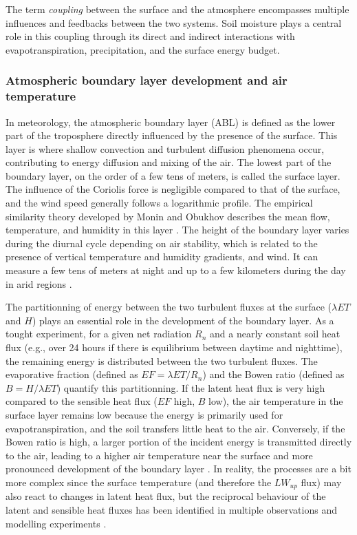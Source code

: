 The term \textit{coupling} between the surface and the atmosphere encompasses multiple influences and feedbacks between the two systems. Soil moisture plays a central role in this coupling through its direct and indirect interactions with evapotranspiration, precipitation, and the surface energy budget.

\subsubsection*{Atmospheric boundary layer development and air temperature}

In meteorology, the atmospheric boundary layer (ABL) is defined as the lower part of the troposphere directly influenced by the presence of the surface. This layer is where shallow convection and turbulent diffusion phenomena occur, contributing to energy diffusion and mixing of the air.
The lowest part of the boundary layer, on the order of a few tens of meters, is called the surface layer. The influence of the Coriolis force is negligible compared to that of the surface, and the wind speed generally follows a logarithmic profile. The empirical similarity theory developed by Monin and Obukhov describes the mean flow, temperature, and humidity in this layer \citep{monin1954osnovnye}.
The height of the boundary layer varies during the diurnal cycle depending on air stability, which is related to the presence of vertical temperature and humidity gradients, and wind. It can measure a few tens of meters at night and up to a few kilometers during the day in arid regions \citep{garratt_review_1994}.

The partitionning of energy between the two turbulent fluxes at the surface ($\lambda ET$ and $H$) plays an essential role in the development of the boundary layer. As a tought experiment, for a given net radiation $R_n$ and a nearly constant soil heat flux (e.g., over 24 hours if there is equilibrium between daytime and nighttime), the remaining energy is distributed between the two turbulent fluxes. The evaporative fraction (defined as $EF = \lambda ET / R_n$) %
and the Bowen ratio (defined as $B = H / \lambda ET$) quantify this partitionning. If the latent heat flux is very high compared to the sensible heat flux ($EF$ high, $B$ low), the air temperature in the surface layer remains low because the energy is primarily used for evapotranspiration, and the soil transfers little heat to the air. Conversely, if the Bowen ratio is high, a larger portion of the incident energy is transmitted directly to the air, leading to a higher air temperature near the surface and more pronounced development of the boundary layer \citep{betts_fife_1995}.
In reality, the processes are a bit more complex since the surface temperature (and therefore the $LW_{up}$ flux) may also react to changes in latent heat flux, but the reciprocal behaviour of the latent and sensible heat fluxes has been identified in multiple observations and modelling experiments \citep{betts_fife_1995, seneviratne_investigating_2010}. %

